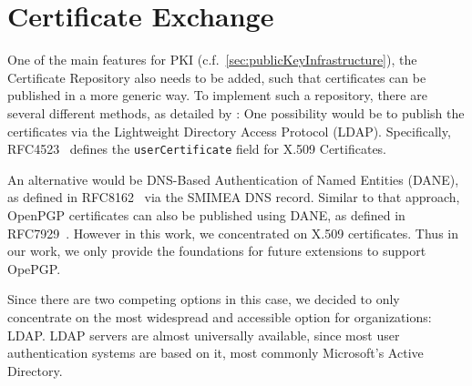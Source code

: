 \section{Certificate Exchange}\label{sec:certificateExchange}
One of the main features for PKI (c.f.~\ref{sec:publicKeyInfrastructure}), the Certificate Repository also needs to be
added, such that certificates can be published in a more generic way.
To implement such a repository, there are several different methods, as detailed by
\citet{hauner2016interoperability}:
One possibility would be to publish the certificates via the Lightweight Directory Access Protocol (LDAP).
Specifically, RFC4523~\cite{RFC4523} defines the \lstinline{userCertificate} field for X.509 Certificates.

An alternative would be DNS-Based Authentication of Named Entities (DANE), as defined in RFC8162~\cite{RFC8162} via the
SMIMEA DNS record.
Similar to that approach, OpenPGP certificates can also be published using DANE, as defined in RFC7929~\cite{RFC7929}.
However in this work, we concentrated on X.509 certificates.
Thus in our work, we only provide the foundations for future extensions to support OpePGP\@.

Since there are two competing options in this case, we decided to only concentrate on the most widespread and accessible
option for organizations: LDAP\@.
LDAP servers are almost universally available, since most user authentication systems are based on it, most commonly
Microsoft's Active Directory.
